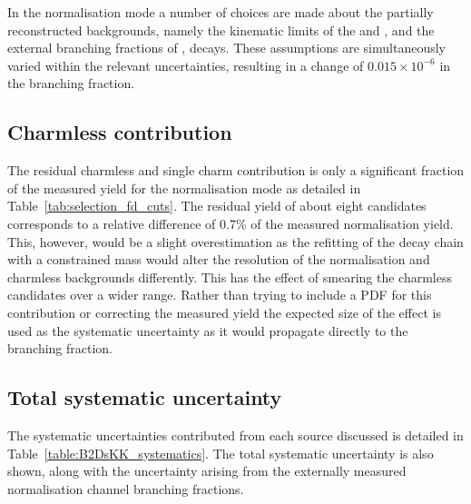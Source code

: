In the normalisation mode a number of choices are made about the partially reconstructed backgrounds, namely the kinematic limits of the \decay{\Bp}{\Dssp\Dzb} and \decay{\Bp}{\Dsp\Dstarzb}, and the external branching fractions of \decay{\Dssp}{\Dsp[\Pgamma/\piz]},
 \decay{\Dstarzb}{\Dzb[\Pgamma/\piz]} decays. These assumptions are simultaneously varied within the relevant uncertainties, resulting in a change of $0.015\times10^{-6}$ in the branching fraction.



\subsection{Charmless contribution}

The residual charmless and single charm contribution is only a significant fraction of the measured yield for the normalisation mode as detailed in Table~\ref{tab:selection_fd_cuts}. The residual yield of about eight candidates corresponds to a relative difference of 0.7\% of the measured normalisation yield. This, however, would be a slight overestimation as the refitting of the decay chain with a constrained \Dsp mass would alter the resolution of the normalisation and charmless backgrounds differently. This has the effect of smearing the charmless candidates over a wider range. Rather than trying to include a PDF for this contribution or correcting the measured yield the expected size of the effect is used as the systematic uncertainty as it would propagate directly to the branching fraction. 


\subsection{Total systematic uncertainty}
The systematic uncertainties contributed from each source discussed is detailed in Table~\ref{table:B2DsKK_systematics}. The total systematic uncertainty is also shown, along with the uncertainty arising from the externally measured normalisation channel branching fractions. 

